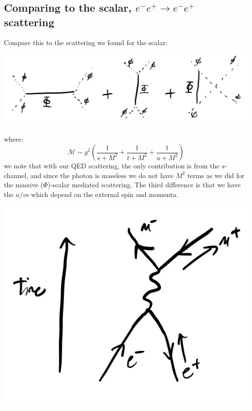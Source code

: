 \subsection{Comparing to the scalar, $e^-e^+ \to e^-e^+$ scattering}

Compare this to the scattering we found for the scalar:

\begin{center}
    \includegraphics[scale=0.35]{Lectures/Images/lec13-scalarscatter.png}
\end{center}

where:
\begin{equation}
    \mathcal{M} \sim g^2\left(\frac{1}{s + M^2} + \frac{1}{t + M^2} + \frac{1}{u + M^2}\right)
\end{equation}
we note that with our QED scattering, the only contribution is from the $s$-channel, and since the photon is massless we do not have $M^2$ terms as we did for the massive ($\Phi$)-scalar mediated scattering. The third difference is that we have the $u/v$s which depend on the external spin and momenta.

\begin{center}
    \includegraphics[scale=0.35]{Lectures/Images/lec13-mumueeschannel.png}
\end{center}

